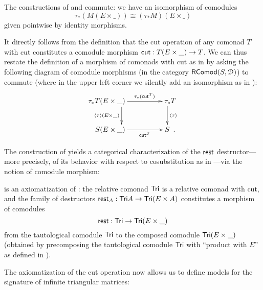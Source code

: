 \documentclass[a4paper,USenglish]{lipics}
\begin{document}
\begin{rem}\label{rem:prod_pullback_commute}
 The constructions of  and  commute:
 we have an isomorphism of comodules 
  \[     \tau_*(M(E\times \_)) \cong (\tau_*M)(E \times \_)        \]
 given pointwise by identity morphisms.
\end{rem}



It directly follows from the definition that the cut operation of any comonad $T$ with cut 
constitutes a comodule morphism $\mathsf{cut} : T(E\times \_) \to T$.
We can thus restate the definition of a morphism of comonads with cut as in  by asking the following diagram 
of comodule morphisms (in the category $\mathsf{RComod}(S,\mathcal{D})$) to commute
(where in the upper left corner we silently add an isomorphism as in ):
 \[ \begin{xy}
       \xymatrix{  **[l] \tau_*T(E\times \_ )  \ar[r]^{\tau_*(\cut^T)} \ar[d]_{\induced{\tau}(E\times \_)}  &  **[r] \tau_*T \ar[d]^{\induced{\tau}} \\
                   **[l]  S (E\times \_ ) \ar[r]_{\cut^S}  &  **[r] S  \enspace .
        }
      \end{xy}
   \]



\noindent
The construction of  yields a categorical characterization of the $\mathsf{rest}$ destructor---%
more precisely, of its behavior with respect to cosubstitution as in ---via the notion of comodule morphism:


\begin{ex}\label{ex:tail_comodule_alternative}
 is an axiomatization of :
the relative comonad $\mathsf{Tri}$ is a relative comonad with cut, and 
the family of destructors $\mathsf{rest}_A : \mathsf{Tri} A \to \mathsf{Tri} (E\times A)$ constitutes a morphism of comodules
\[ \mathsf{rest} : \mathsf{Tri} \to \mathsf{Tri} (E \times \_ ) \]
from the tautological comodule $\mathsf{Tri}$ to the composed comodule $\mathsf{Tri} (E\times \_)$ (obtained by precomposing the tautological comodule $\mathsf{Tri}$
with \enquote{product with $E$} as defined in ).
  
\end{ex}


The axiomatization of the cut operation now allows us to define models for the signature of infinite triangular matrices:
\end{document}
